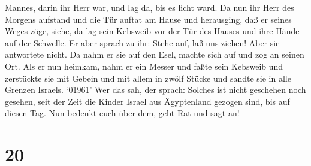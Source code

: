 Mannes, darin ihr Herr war, und lag da, bis es licht ward. 
Da nun ihr Herr des Morgens aufstand und die Tür auftat am Hause und
herausging, daß er seines Weges zöge, siehe, da lag sein Kebsweib vor
der Tür des Hauses und ihre Hände auf der Schwelle.  Er
aber sprach zu ihr: Stehe auf, laß uns ziehen! Aber sie antwortete
nicht. Da nahm er sie auf den Esel, machte sich auf und zog an seinen
Ort.  Als er nun heimkam, nahm er ein Messer und faßte sein
Kebsweib und zerstückte sie mit Gebein und mit allem in zwölf Stücke und
sandte sie in alle Grenzen Israels.  `01961' Wer das sah,
der sprach: Solches ist nicht geschehen noch gesehen, seit der Zeit die
Kinder Israel aus Ägyptenland gezogen sind, bis auf diesen Tag. Nun
bedenkt euch über dem, gebt Rat und sagt an!

\hypertarget{section-19}{%
\section{20}\label{section-19}}


